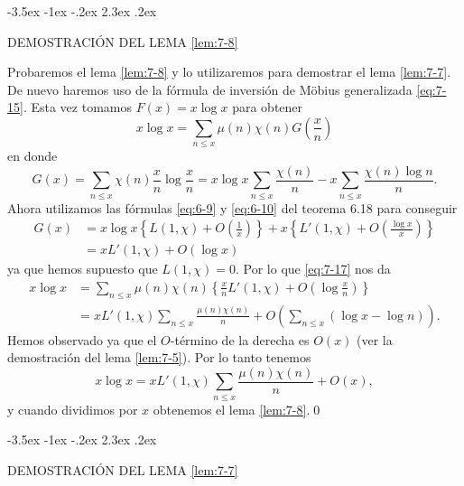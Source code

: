 \documentclass[12pt,a4paper]{book}
\makeatletter
\renewcommand\section{\@startsection{section}{1}{\z@}%
  {-3.5ex \@plus -1ex \@minus -.2ex}%
  {2.3ex \@plus .2ex}%
  {\normalfont\Large\bfseries\raggedright}}
\makeatother
\begin{document}
    \section{DEMOSTRACIÓN DEL LEMA \ref{lem:7-8}}

    Probaremos el lema \ref{lem:7-8} y lo utilizaremos para demostrar el lema
    \ref{lem:7-7}. De nuevo haremos uso de la fórmula de inversión de Möbius generalizada
    \eqref{eq:7-15}. Esta vez tomamos $F(x)=x\log x$ para obtener
    \begin{equation}\label{eq:7-17}
        x\log x=\sum_{n\leq x}\mu(n)\chi(n)G\left(\frac{x}{n}\right)
    \end{equation}
    en donde
    \begin{equation*}
        G(x)=\sum_{n\leq x}\chi(n)\frac{x}{n}\log\frac{x}{n}
        =x\log x\sum_{n\leq x}\frac{\chi(n)}{n}-x\sum_{n\leq x}\frac{\chi(n)\log n}{n}.
    \end{equation*}
    Ahora utilizamos las fórmulas \eqref{eq:6-9} y \eqref{eq:6-10} del teorema 6.18 para
    conseguir
    \begin{align*}
        G(x)&=x\log x\left\{L(1,\chi)+O\left(\frac{1}{x}\right)\right\}
        +x\left\{L'(1,\chi)+O\left(\frac{\log x}{x}\right)\right\}\\
        &=xL'(1,\chi)+O(\log x)
    \end{align*}
    ya que hemos supuesto que $L(1,\chi)=0$. Por lo que \eqref{eq:7-17} nos da
    \begin{align*}
        x\log x&=\sum_{n\leq x}\mu(n)\chi(n)\left\{\frac{x}{n}L'(1,\chi)+O\left(\log\frac{x}{n}\right)\right\}\\
        &=xL'(1,\chi)\sum_{n\leq x}\frac{\mu(n)\chi(n)}{n}+O\left(\sum_{n\leq x}(\log x-\log n)\right).
    \end{align*}
    Hemos observado ya que el $O$-término de la derecha es $O(x)$ (ver la demostración del
    lema \ref{lem:7-5}). Por lo tanto tenemos
    \begin{equation*}
        x\log x=xL'(1,\chi)\sum_{n\leq x}\frac{\mu(n)\chi(n)}{n}+O(x),
    \end{equation*}
    y cuando dividimos por $x$ obtenemos el lema \ref{lem:7-8}.\qed

    \section{DEMOSTRACIÓN DEL LEMA \ref{lem:7-7}}
\end{document}
